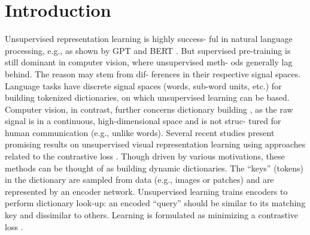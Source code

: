\documentclass[10pt,twocolumn]{article}  %
\begin{document}
\section{Introduction}
\hspace{1em} Unsupervised representation learning is highly success-
ful in natural language processing, e.g., as shown by GPT
\cite{50_radford2018improving, 51_radford2019language} and BERT \cite{12_devlin2019bert}. But supervised pre-training is still
dominant in computer vision, where unsupervised meth-
ods generally lag behind. The reason may stem from dif-
ferences in their respective signal spaces. Language tasks
have discrete signal spaces (words, sub-word units, etc.)
for building tokenized dictionaries, on which unsupervised
learning can be based. Computer vision, in contrast, further
concerns dictionary building \cite{54_sivic2003video, 9_coates2011importance, 5_chatfield2011devil}, as the raw signal is
in a continuous, high-dimensional space and is not struc-
tured for human communication (e.g., unlike words).
Several recent studies \cite{61_wu2018unsupervised, 46_oord2018representation, 36_hjelm2019learning, 66_zhuang2019local, 35_henaff2019data, 56_tian2019contrastive, 2_bachman2019learning}
present promising results on unsupervised visual representation
learning using approaches related to the contrastive loss
\cite{29_hadsell2006dimensionality}. Though driven by various motivations, these methods
can be thought of as building dynamic dictionaries. The
“keys” (tokens) in the dictionary are sampled from data
(e.g., images or patches) and are represented by an encoder
network. Unsupervised learning trains encoders to perform
dictionary look-up: an encoded “query” should be similar
to its matching key and dissimilar to others. Learning is
formulated as minimizing a contrastive loss \cite{29_hadsell2006dimensionality}.
\end{document}
